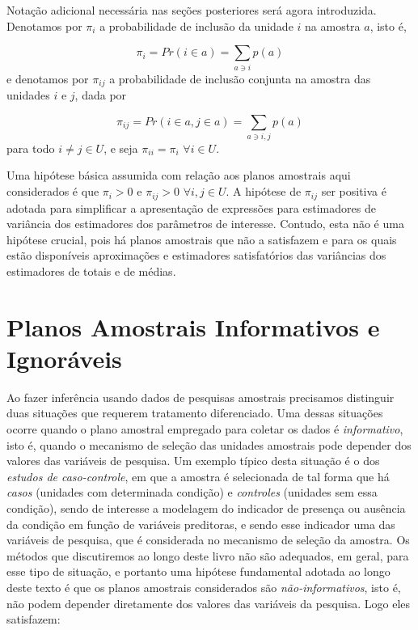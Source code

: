 \documentclass[
  12pt,
  brazilian,
]{book}
\theoremstyle{definition}
\theoremstyle{definition}
\theoremstyle{definition}
\theoremstyle{definition}
\theoremstyle{remark}
\begin{document}
Notação adicional necessária nas seções posteriores será agora introduzida.
Denotamos por \(\pi_i\) a probabilidade de inclusão da unidade \(i\) na amostra \(a\),
isto é,

\begin{equation}
\pi_i = Pr\left( i \in a \right) = \sum_{a \ni i} p(a)  \label{eq:ref5}
\end{equation} e denotamos por \(\pi_{ij}\) a probabilidade de inclusão conjunta
na amostra das unidades \(i\) e \(j\), dada por

\begin{equation}
\pi_{ij} = Pr \left( i \in a , j \in a \right) = \sum_{a \ni i,j} p(a) \label{eq:ref6}
\end{equation} para todo \(i \neq j \in U\), e seja \(\pi_{ii} = \pi_{i}\)
\(\forall i \in U.\)

Uma hipótese básica assumida com relação aos planos amostrais aqui considerados
é que \(\pi_i > 0\) e \(\pi_{ij} > 0\) \(\forall i,j \in U.\) A hipótese de \(\pi_{ij}\)
ser positiva é adotada para simplificar a apresentação de expressões para
estimadores de variância dos estimadores dos parâmetros de interesse. Contudo,
esta não é uma hipótese crucial, pois há planos amostrais que não a satisfazem e
para os quais estão disponíveis aproximações e estimadores satisfatórios das
variâncias dos estimadores de totais e de médias.

\hypertarget{inform}{%
\section{Planos Amostrais Informativos e Ignoráveis}\label{inform}}

Ao fazer inferência usando dados de pesquisas amostrais precisamos distinguir
duas situações que requerem tratamento diferenciado. Uma dessas situações ocorre
quando o plano amostral empregado para coletar os dados é \emph{informativo}, isto é,
quando o mecanismo de seleção das unidades amostrais pode depender dos valores
das variáveis de pesquisa. Um exemplo típico desta situação é o dos \emph{estudos de
caso-controle}, em que a amostra é selecionada de tal forma que há \emph{casos}
(unidades com determinada condição) e \emph{controles} (unidades sem essa condição),
sendo de interesse a modelagem do indicador de presença ou ausência da condição
em função de variáveis preditoras, e sendo esse indicador uma das variáveis de
pesquisa, que é considerada no mecanismo de seleção da amostra. Os métodos que
discutiremos ao longo deste livro não são adequados, em geral, para esse tipo de
situação, e portanto uma hipótese fundamental adotada ao longo deste texto é que
os planos amostrais considerados são \emph{não-informativos}, isto é, não podem
depender diretamente dos valores das variáveis da pesquisa. Logo eles
satisfazem:
\end{document}
